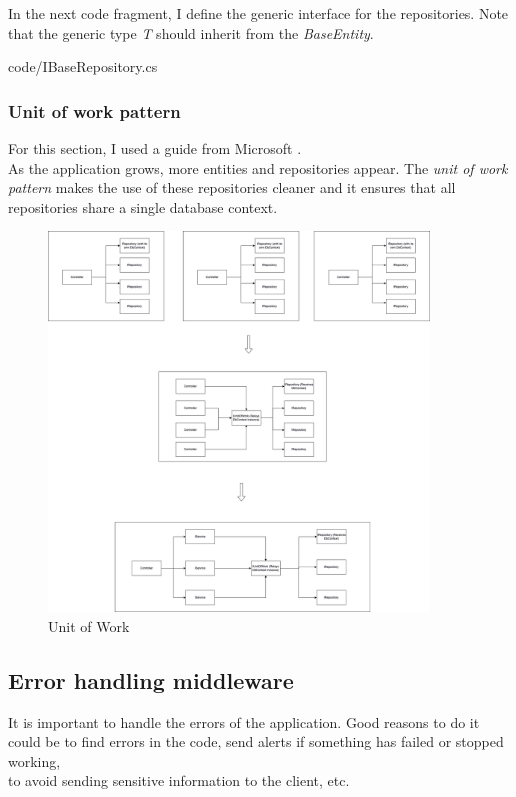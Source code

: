             In the next code fragment, I define the generic interface for the repositories. Note that the generic type \textit{T} should inherit from the \textit{BaseEntity}.
            
            {code/IBaseRepository.cs}

        \subsubsection{Unit of work pattern}
            For this section, I used a guide from Microsoft \cite{RepoAndUW}. \\
            As the application grows, more entities and repositories appear. The \textit{unit of work pattern} makes the use of these repositories cleaner and it ensures that all repositories share a single database context. \\

            \begin{figure}[H]
                \centering
                    \includegraphics[width=0.9\textwidth]{assets/diagrams/unitofwork.png}
                \caption{Unit of Work}
                \label{fig:implementation_unit_work}
            \end{figure}
    
    \subsection{Error handling middleware}
    It is important to handle the errors of the application. Good reasons to do it could be to find errors in the code, send alerts if something has failed or stopped working, \\
    to avoid sending sensitive information to the client, etc. \\

